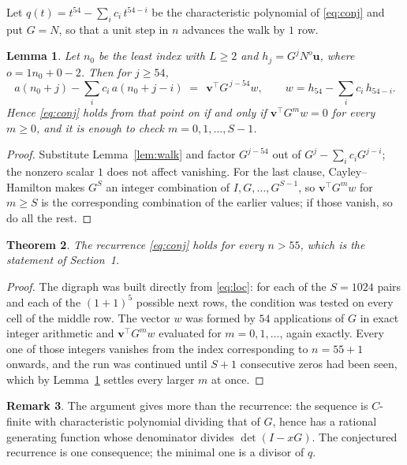 \documentclass[11pt,a4paper]{article}
\theoremstyle{plain}
\newtheorem{theorem}{Theorem}
\newtheorem{lemma}[theorem]{Lemma}
\theoremstyle{definition}
\newtheorem{remark}[theorem]{Remark}
\begin{document}
Let $q(t)=t^{54}-\sum_i c_i\,t^{54-i}$ be the characteristic polynomial of
\eqref{eq:conj} and put $G=N$, so that a unit step in $n$ advances the walk by
$1$ row.

\begin{lemma}\label{lem:crit}
Let $n_0$ be the least index with $L\ge2$ and $h_j=G^{j}N^{o}\mathbf{u}$, where
$o=1n_0+0-2$. Then for $j\ge54$,
\[
a(n_0+j)-\sum_i c_i\,a(n_0+j-i)\;=\;\,\mathbf{v}^{\!\top}G^{\,j-54}w,
\qquad w=h_{54}-\sum_i c_i\,h_{54-i} .
\]
Hence \eqref{eq:conj} holds from that point on if and only if
$\mathbf{v}^{\!\top}G^{m}w=0$ for every $m\ge0$, and it is enough to check
$m=0,1,\dots,S-1$.
\end{lemma}

\begin{proof}
Substitute Lemma~\ref{lem:walk} and factor $G^{j-54}$ out of
$G^{j}-\sum_ic_iG^{j-i}$; the nonzero scalar $1$ does not affect
vanishing. For the last clause, Cayley--Hamilton makes $G^{S}$ an integer combination of
$I,G,\dots,G^{S-1}$, so $\mathbf{v}^{\!\top}G^{m}w$ for $m\ge S$ is the corresponding
combination of the earlier values; if those vanish, so do all the rest.
\end{proof}

\begin{theorem}
The recurrence \eqref{eq:conj} holds for every $n>55$, which is the statement of
Section~1.
\end{theorem}

\begin{proof}
The digraph was built directly from \eqref{eq:loc}: for each of the $S=1024$ pairs and each
of the $(1+1)^{5}$ possible next rows, the condition was tested on every cell of
the middle row. The vector $w$ was formed by $54$ applications of $G$ in exact integer
arithmetic and $\mathbf{v}^{\!\top}G^{m}w$ evaluated for $m=0,1,\dots$, again exactly.
Every one of those integers vanishes from the index corresponding to $n=55+1$ onwards,
and the run was continued until $S+1$ consecutive zeros had been seen, which by
Lemma~\ref{lem:crit} settles every larger $m$ at once.
\end{proof}

\begin{remark}
The argument gives more than the recurrence: the sequence is $C$-finite with characteristic
polynomial dividing that of $G$, hence has a rational generating function whose denominator
divides $\det(I-xG)$. The conjectured recurrence is one consequence; the minimal one is a
divisor of $q$.
\end{remark}
\end{document}
